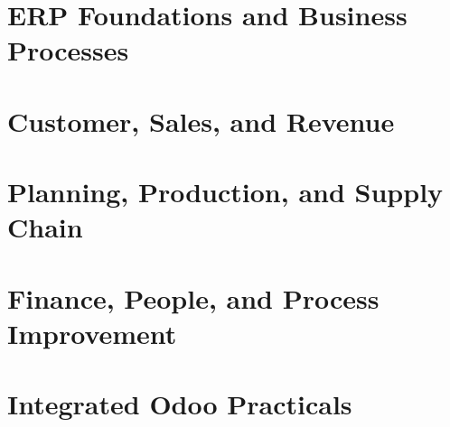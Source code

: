\documentclass[11pt,oneside,a4paper]{report}
\begin{document}
\hypersetup{pageanchor=false}



\cleardoublepage
{}
\setcounter{tocdepth}{0}
\begingroup\small\setlength{\parskip}{0pt}\tableofcontents\endgroup
\newpage
\hypersetup{pageanchor=true}



\cleardoublepage
{}

\part{ERP Foundations and Business Processes}



\part{Customer, Sales, and Revenue}



\part{Planning, Production, and Supply Chain}




\part{Finance, People, and Process Improvement}




\part{Integrated Odoo Practicals}












\end{document}
